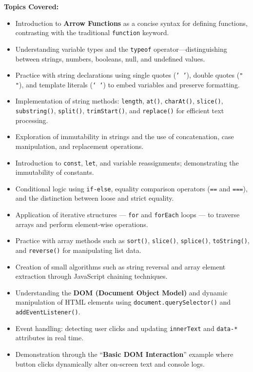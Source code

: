 \documentclass[a4paper,12pt,oneside]{report}
\numberwithin{equation}{chapter}
\numberwithin{figure}{chapter}
\numberwithin{table}{chapter}
\begin{document}
\textbf{Topics Covered:}
\begin{itemize}
    \item Introduction to \textbf{Arrow Functions} as a concise syntax for defining functions, contrasting with the traditional \texttt{function} keyword.
    \item Understanding variable types and the \texttt{typeof} operator—distinguishing between strings, numbers, booleans, null, and undefined values.
    \item Practice with string declarations using single quotes (\texttt{' '}), double quotes (\texttt{" "}), and template literals (\texttt{` `}) to embed variables and preserve formatting.
    \item Implementation of string methods: \texttt{length}, \texttt{at()}, \texttt{charAt()}, \texttt{slice()}, \texttt{substring()}, \texttt{split()}, \texttt{trimStart()}, and \texttt{replace()} for efficient text processing.
    \item Exploration of immutability in strings and the use of concatenation, case manipulation, and replacement operations.
    \item Introduction to \texttt{const}, \texttt{let}, and variable reassignments; demonstrating the immutability of constants.
    \item Conditional logic using \texttt{if-else}, equality comparison operators (\texttt{==} and \texttt{===}), and the distinction between loose and strict equality.
    \item Application of iterative structures — \texttt{for} and \texttt{forEach} loops — to traverse arrays and perform element-wise operations.
    \item Practice with array methods such as \texttt{sort()}, \texttt{slice()}, \texttt{splice()}, \texttt{toString()}, and \texttt{reverse()} for manipulating list data.
    \item Creation of small algorithms such as string reversal and array element extraction through JavaScript chaining techniques.
    \item Understanding the \textbf{DOM (Document Object Model)} and dynamic manipulation of HTML elements using \texttt{document.querySelector()} and \texttt{addEventListener()}.
    \item Event handling: detecting user clicks and updating \texttt{innerText} and \texttt{data-*} attributes in real time.
    \item Demonstration through the “\textbf{Basic DOM Interaction}” example where button clicks dynamically alter on-screen text and console logs.

\end{itemize}
\end{document}
